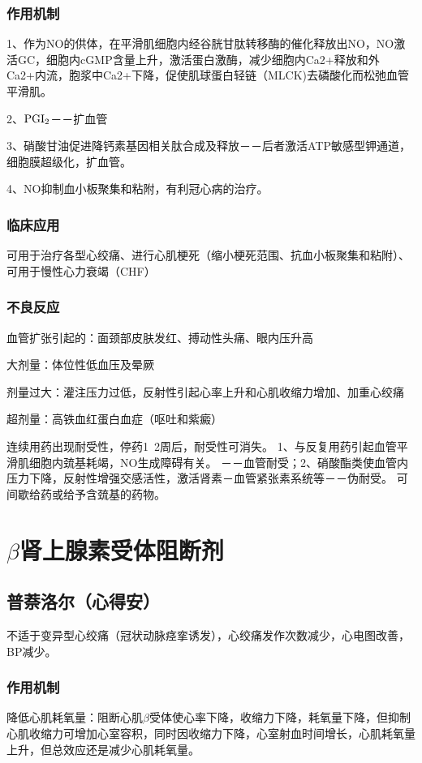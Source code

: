 \documentclass[UTF8]{ctexbook}
\begin{document}
\subsubsection{作用机制}
1、作为NO的供体，在平滑肌细胞内经谷胱甘肽转移酶的催化释放出NO，NO激活GC，细胞内cGMP含量上升，激活蛋白激酶，减少细胞内Ca2+释放和外Ca2+内流，胞浆中Ca2+下降，促使肌球蛋白轻链（MLCK)去磷酸化而松弛血管平滑肌。

2、\(\textup{PGI}_{2}\)－－扩血管

3、硝酸甘油促进降钙素基因相关肽合成及释放－－后者激活ATP敏感型钾通道，细胞膜超级化，扩血管。

4、NO抑制血小板聚集和粘附，有利冠心病的治疗。
\subsubsection{临床应用}
可用于治疗各型心绞痛、进行心肌梗死（缩小梗死范围、抗血小板聚集和粘附）、可用于慢性心力衰竭（CHF）

\subsubsection{不良反应}
血管扩张引起的：面颈部皮肤发红、搏动性头痛、眼内压升高

大剂量：体位性低血压及晕厥

剂量过大：灌注压力过低，反射性引起心率上升和心肌收缩力增加、加重心绞痛

超剂量：高铁血红蛋白血症（呕吐和紫癜）

连续用药出现耐受性，停药1~2周后，耐受性可消失。
1、与反复用药引起血管平滑肌细胞内巯基耗竭，NO生成障碍有关。 －－血管耐受；2、硝酸酯类使血管内压力下降，反射性增强交感活性，激活肾素－血管紧张素系统等－－伪耐受。
可间歇给药或给予含巯基的药物。
\section{\(\beta\)肾上腺素受体阻断剂}
\subsection{普萘洛尔（心得安）}
不适于变异型心绞痛（冠状动脉痉挛诱发），心绞痛发作次数减少，心电图改善，BP减少。
\subsubsection{作用机制}
降低心肌耗氧量：阻断心肌\(\beta\)受体使心率下降，收缩力下降，耗氧量下降，但抑制心肌收缩力可增加心室容积，同时因收缩力下降，心室射血时间增长，心肌耗氧量上升，但总效应还是减少心肌耗氧量。
\end{document}
